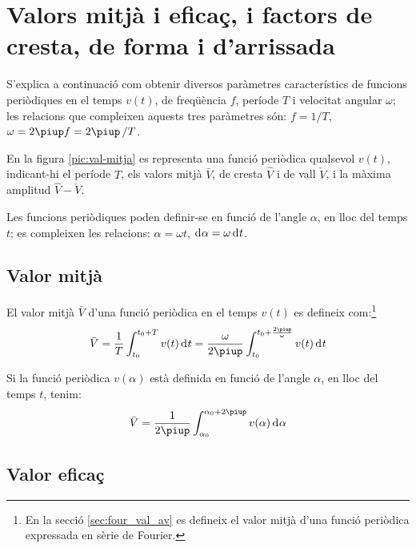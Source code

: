 \section{Valors mitjà i eficaç, i factors de cresta, de forma i d'arrissada}\label{sec:val_mitja_ef}

S'explica a continuació com obtenir diversos paràmetres característics de funcions periòdiques  en el temps $v(t)$, de freqüència $f$, període $T$ i velocitat angular $\omega$; les relacions que compleixen aquests tres paràmetres són: $f = 1/T$, $\omega=2\piup f = 2\piup\,/T$.

En la figura \vref{pic:val-mitja} es representa una funció periòdica qualsevol $v(t)$, indicant-hi el període $T$, els valors mitjà $\bar{V}$, de cresta $\hat{V}$ i de vall $\check{V}$, i la màxima amplitud  $\hat{V}-\check{V}$.
\begin{center}
    
    \label{pic:val-mitja}
\end{center}

Les funcions periòdiques poden  definir-se en funció de l'angle $\alpha$, en lloc del temps $t$; es compleixen les relacions:
$\alpha=\omega t$, $\diff\alpha=\omega\diff t$.

\subsection{Valor mitjà}

El valor mitjà $\bar{V}$ d'una funció
periòdica en el temps $v(t)$ es
defineix com:\footnote{En la secció \ref{sec:four_val_av} es defineix el valor mitjà d'una funció periòdica expressada en sèrie de Fourier.}
\begin{equation}
    \bar{V} = \frac{1}{T} \int_{t_0}^{t_0+T} v(t) \diff t =
    \frac{\omega}{2\piup} \int_{t_0}^{t_0+\frac{2\piup}{\omega}} v(t) \diff t\label{eq:vm_t}
\end{equation}

Si la funció periòdica $v(\alpha)$ està definida en funció de
l'angle $\alpha$, en lloc del temps $t$, tenim:
\begin{equation}
    \bar{V} = \frac{1}{2\piup} \int_{\alpha_0}^{\alpha_0+2\piup} v(\alpha) \diff \alpha
    \label{eq:vm_alfa}
\end{equation}

\subsection{Valor eficaç}

